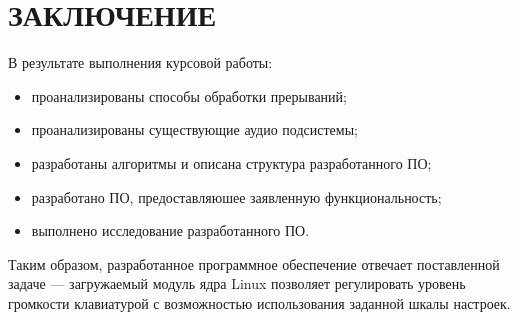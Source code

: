 \chapter*{ЗАКЛЮЧЕНИЕ}

В результате выполнения курсовой работы:
\begin{itemize}
    \item проанализированы способы обработки прерываний;
    \item проанализированы существующие аудио подсистемы;
    \item разработаны алгоритмы и описана структура разработанного ПО;
    \item разработано ПО, предоставляюшее заявленную функциональность;
    \item выполнено исследование разработанного ПО.
\end{itemize}

Таким образом, разработанное программное обеспечение отвечает поставленной задаче --- загружаемый модуль ядра Linux позволяет регулировать уровень громкости клавиатурой с возможностью использования заданной шкалы настроек.